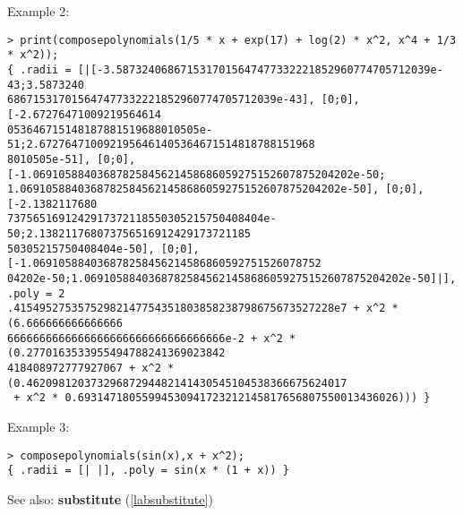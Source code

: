 \noindent Example 2: 
\begin{center}\begin{minipage}{15cm}\begin{Verbatim}[frame=single,commandchars=\\\|\~]
> print(composepolynomials(1/5 * x + exp(17) + log(2) * x^2, x^4 + 1/3 * x^2));
{ .radii = [|[-3.5873240686715317015647477332221852960774705712039e-43;3.5873240
686715317015647477332221852960774705712039e-43], [0;0], [-2.67276471009219564614
053646715148187881519688010505e-51;2.6727647100921956461405364671514818788151968
8010505e-51], [0;0], [-1.06910588403687825845621458686059275152607875204202e-50;
1.06910588403687825845621458686059275152607875204202e-50], [0;0], [-2.1382117680
7375651691242917372118550305215750408404e-50;2.138211768073756516912429173721185
50305215750408404e-50], [0;0], [-1.069105884036878258456214586860592751526078752
04202e-50;1.06910588403687825845621458686059275152607875204202e-50]|], .poly = 2
.41549527535752982147754351803858238798675673527228e7 + x^2 * (6.666666666666666
6666666666666666666666666666666666e-2 + x^2 * (0.2770163533955494788241369023842
418408972777927067 + x^2 * (0.46209812037329687294482141430545104538366675624017
 + x^2 * 0.69314718055994530941723212145817656807550013436026))) }
\end{Verbatim}
\end{minipage}\end{center}
\noindent Example 3: 
\begin{center}\begin{minipage}{15cm}\begin{Verbatim}[frame=single,commandchars=\\\|\~]
> composepolynomials(sin(x),x + x^2);
{ .radii = [| |], .poly = sin(x * (1 + x)) }
\end{Verbatim}
\end{minipage}\end{center}
See also: \textbf{substitute} (\ref{labsubstitute})
